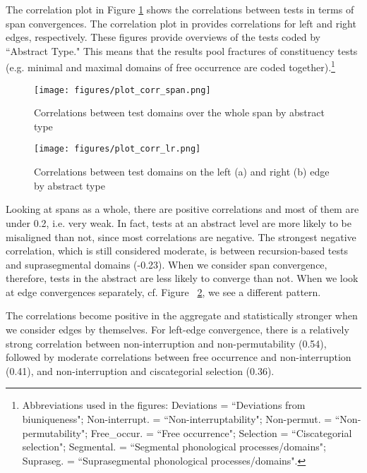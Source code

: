 \documentclass[output=paper,draftmode]{langscibook}
\begin{document}
The correlation plot in Figure \ref{discussion:fig:correlationmatrixabstracttypes} shows the correlations between tests in terms of span convergences. The correlation plot in  provides correlations for left and right edges, respectively.
These figures provide overviews of the tests coded by ``Abstract Type." This means that the results pool fractures of constituency tests (e.g. minimal and maximal domains of free occurrence are coded together).\footnote{Abbreviations used in the figures: Deviations = ``Deviations from biuniqueness"; Non-interrupt. = ``Non-interruptability"; Non-permut. = ``Non-permutability"; Free\_occur. = ``Free occurrence"; Selection = ``Ciscategorial selection"; Segmental. = ``Segmental phonological processes/domains"; Supraseg. = ``Suprasegmental phonological processes/domains".} 

\begin{figure}
    \texttt{[image: figures/plot\_corr\_span.png]}
    \caption{Correlations between test domains over the whole span by abstract type}
    \label{discussion:fig:correlationmatrixabstracttypes}
\end{figure}

\begin{figure}
    \texttt{[image: figures/plot\_corr\_lr.png]}
    \caption{Correlations between test domains on the left (a) and right (b) edge by abstract type}
    \label{discussion:fig:correlationmatrixabstracttypes_lr}
\end{figure}

Looking at spans as a whole, there are positive correlations and most of them are under 0.2, i.e. very weak. In fact, tests at an abstract level are more likely to be misaligned than not, since most correlations are negative. The strongest negative correlation, which is still considered moderate, is between recursion-based tests and suprasegmental domains (-0.23).
When we consider span convergence, therefore, tests in the abstract are less likely to converge than not. 
When we look at edge convergences separately, cf. Figure ~\ref{discussion:fig:correlationmatrixabstracttypes_lr}, we see a different pattern.

The correlations become positive in the aggregate and statistically stronger when we consider edges by themselves.
For left-edge convergence, there is a relatively strong correlation between non-interruption and non-permutability (0.54), followed by moderate correlations between free occurrence and non-interruption (0.41), and non-interruption and ciscategorial selection (0.36).
\end{document}
